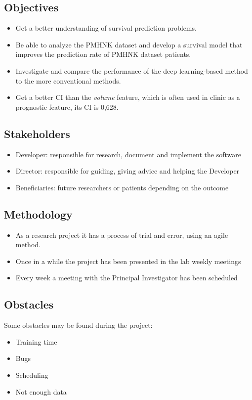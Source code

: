 \subsection{Objectives}
\begin{frame}{\insertsubsec}
  \begin{itemize}
    \item Get a better understanding of survival prediction problems.
    \item Be able to analyze the PMHNK dataset and develop a survival model that improves the 
    prediction rate of PMHNK dataset patients.
    \item Investigate and compare the performance of the deep learning-based method to 
    the more conventional methods.
    \item Get a better CI than the \emph{volume} feature, which is often used in clinic as a
    prognostic feature, its CI is 0,628.
  \end{itemize}
\end{frame}

\subsection{Stakeholders}
\begin{frame}{\insertsubsec}
  \begin{itemize}
    \item Developer: responsible for research, document and implement the software
    \item Director: responsible for guiding, giving advice and helping the Developer
    \item Beneficiaries: future researchers or patients depending on the outcome
  \end{itemize}
\end{frame}

\subsection{Methodology}
\begin{frame}{\insertsubsec}
  \begin{itemize}
    \item As a research project it has a process of trial and error, using an agile method.
    \item Once in a while the project has been presented in the lab weekly meetings
    \item Every week a meeting with the Principal Investigator has been scheduled
  \end{itemize}
\end{frame}

\subsection{Obstacles}
\begin{frame}{\insertsubsec}
  Some obstacles may be found during the project:

  \begin{itemize}
    \item Training time
    \item Bugs
    \item Scheduling
    \item Not enough data
  \end{itemize}
\end{frame}
